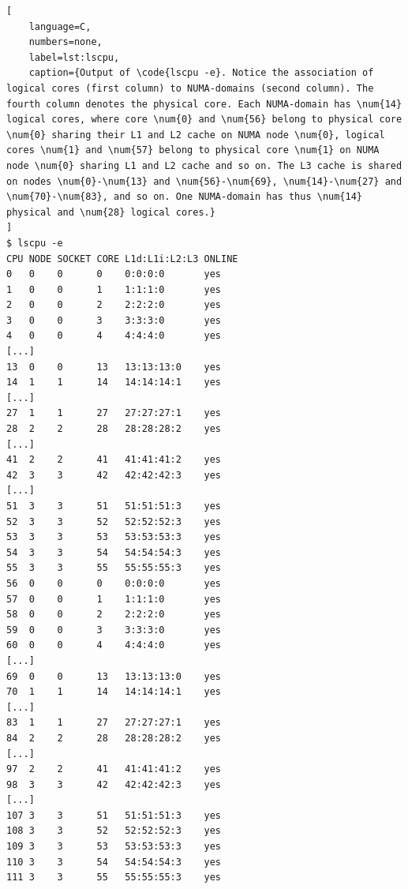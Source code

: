 \documentclass{article}
\theoremstyle{plain} %
\theoremstyle{convention} %
\theoremstyle{remark} %
\def\code#1{\texttt{#1}}
\numberwithin{equation}{section}
\begin{document}
\begin{lstlisting}[
    language=C,
    numbers=none,
    label=lst:lscpu,
    caption={Output of \code{lscpu -e}. Notice the association of logical cores (first column) to NUMA-domains (second column). The fourth column denotes the physical core. Each NUMA-domain has \num{14} logical cores, where core \num{0} and \num{56} belong to physical core \num{0} sharing their L1 and L2 cache on NUMA node \num{0}, logical cores \num{1} and \num{57} belong to physical core \num{1} on NUMA node \num{0} sharing L1 and L2 cache and so on. The L3 cache is shared on nodes \num{0}-\num{13} and \num{56}-\num{69}, \num{14}-\num{27} and \num{70}-\num{83}, and so on. One NUMA-domain has thus \num{14} physical and \num{28} logical cores.}
]
$ lscpu -e
CPU NODE SOCKET CORE L1d:L1i:L2:L3 ONLINE
0   0    0      0    0:0:0:0       yes
1   0    0      1    1:1:1:0       yes
2   0    0      2    2:2:2:0       yes
3   0    0      3    3:3:3:0       yes
4   0    0      4    4:4:4:0       yes
[...]
13  0    0      13   13:13:13:0    yes
14  1    1      14   14:14:14:1    yes
[...]
27  1    1      27   27:27:27:1    yes
28  2    2      28   28:28:28:2    yes
[...]
41  2    2      41   41:41:41:2    yes
42  3    3      42   42:42:42:3    yes
[...]
51  3    3      51   51:51:51:3    yes
52  3    3      52   52:52:52:3    yes
53  3    3      53   53:53:53:3    yes
54  3    3      54   54:54:54:3    yes
55  3    3      55   55:55:55:3    yes
56  0    0      0    0:0:0:0       yes
57  0    0      1    1:1:1:0       yes
58  0    0      2    2:2:2:0       yes
59  0    0      3    3:3:3:0       yes
60  0    0      4    4:4:4:0       yes
[...]
69  0    0      13   13:13:13:0    yes
70  1    1      14   14:14:14:1    yes
[...]
83  1    1      27   27:27:27:1    yes
84  2    2      28   28:28:28:2    yes
[...]
97  2    2      41   41:41:41:2    yes
98  3    3      42   42:42:42:3    yes
[...]
107 3    3      51   51:51:51:3    yes
108 3    3      52   52:52:52:3    yes
109 3    3      53   53:53:53:3    yes
110 3    3      54   54:54:54:3    yes
111 3    3      55   55:55:55:3    yes
\end{lstlisting}
\end{document}
